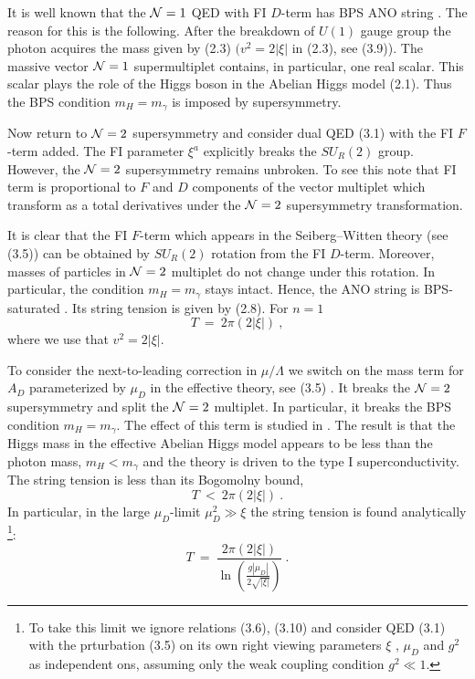 \documentclass[a4paper,12pt]{article}
\begin{document}
It is well known that the ${\cal N}=1$ QED  with FI $D$-term has BPS
ANO string \cite{HS,DDT,GS}. The reason for this is the following.
After the breakdown of $U(1)$ gauge group the photon acquires
the mass given by
(2.3) $(v^2=2|\xi|$ in (2.3), see (3.9)). The massive
vector ${\cal N}=1$ supermultiplet contains, in particular, one real
scalar. This scalar plays the role of the Higgs boson in the
Abelian Higgs model (2.1). Thus the BPS condition $m_H=m_\gamma$
is imposed by supersymmetry.

Now return to ${\cal N}=2$ supersymmetry and consider dual
QED (3.1) with the FI $F$-term added.
 The FI parameter $\xi^a$
explicitly breaks the $SU_R(2)$ group. However, the ${\cal N} =2$
supersymmetry remains unbroken. To see this note that FI term
is proportional to   $F$ and $D$ components of the vector multiplet
which transform as a total derivatives under the ${\cal N} =2$
supersymmetry transformation.


It is clear that  the FI $F$-term which appears in the
Seiberg--Witten theory (see (3.5)) can be obtained by $SU_R(2)$
rotation from the FI $D$-term. Moreover, masses of particles in
${\cal N} =2$ multiplet do not change under this rotation.
In particular, the condition
$m_H=m_\gamma$ stays intact. Hence, the ANO
string is BPS-saturated   \cite{HSZ,Sp,VY}.
Its string tension is given by (2.8). For $n=1$
\begin{equation}
T\ =\ 2\pi(2|\xi|)\ ,
\end{equation}
where we use that $v^2=2|\xi |$.

To consider the next-to-leading correction in $\mu /\Lambda$
we switch on   the mass
term for $A_D$  parameterized by $\mu_{D}$
in the effective theory, see (3.5)
. It breaks the ${\cal N}=2$ supersymmetry and
split the ${\cal N}=2$ multiplet. In particular, it breaks the
BPS condition $m_H=m_\gamma$. The effect of this term is studied
in \cite{VY}. The result is that the Higgs mass in the effective
Abelian Higgs model appears to be less than the photon mass,
$m_H<m_\gamma$ and the theory is driven to the type I
superconductivity. The string tension is less than its Bogomolny
bound,
\begin{equation}
T\ <\ 2\pi(2|\xi|)\ .
\end{equation}
In particular, in the large $\mu_{D}$-limit $\mu_{D}^2\gg\xi$ the string
tension is found analytically \footnote{To  take this limit
 we ignore relations (3.6), (3.10) and 
consider  QED (3.1) with the prturbation (3.5)
on its own right viewing parameters  $\xi$ , $\mu_{D}$ and $g^2$
as independent ons, assuming only the weak coupling condition
$g^2\ll 1$\cite{VY}.}\cite{VY}:
\begin{equation}
T\ =\ \frac{2\pi(2|\xi|)}{\ln(\frac{g |\mu_{D}|}{2\sqrt{|\xi|}})}\ .
\end{equation}
\end{document}
